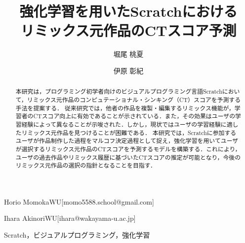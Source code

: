 \documentclass[submit,techrep,noauthor]{ipsj}
\begin{document}
\title{強化学習を用いたScratchにおける\\
リミックス元作品のCTスコア予測}







\author{堀尾 桃夏}{Horio Momoka}{WU}[momo5588.school@gmail.com]
\author{伊原 彰紀}{Ihara Akinori}{WU}[ihara@wakayama-u.ac.jp]

\begin{abstract}
本研究は，プログラミング初学者向けのビジュアルプログラミング言語Scratchにおいて，リミックス元作品のコンピュテーショナル・シンキング（CT）スコアを予測する手法を提案する．
従来研究では，他者の作品を複製・編集するリミックス機能が，学習者のCTスコア向上に有効であることが示されている．また，その効果はユーザの学習経験によって異なることが示唆された．しかし，現状ではユーザの学習経験に適したリミックス元作品を見つけることが困難である．
本研究では，Scratchに参加するユーザが作品制作した過程をマルコフ決定過程として捉え，強化学習を用いてユーザが選択するリミックス元作品のCTスコアを予測するモデルを構築する．これにより，ユーザの過去作品やリミックス履歴に基づいたCTスコアの推定が可能となり，今後のリミックス元作品の選択の指針となることを目指す．
\end{abstract}


%
\begin{jkeyword}
    {Scratch，ビジュアルプログラミング，強化学習}
\end{jkeyword}
%

%
\end{document}
